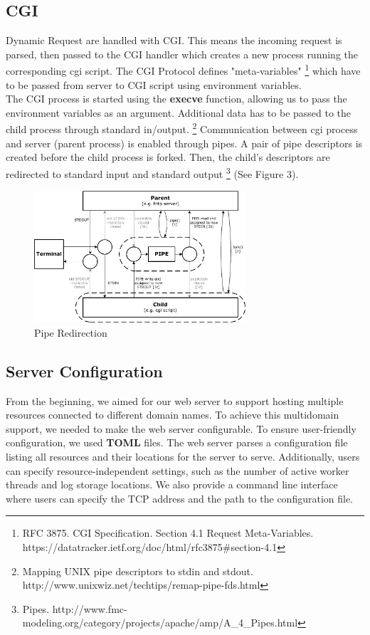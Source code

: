 \subsection*{CGI}
Dynamic Request are handled with CGI. This means the incoming request is parsed, then passed to the CGI handler which creates a new process running the corresponding cgi script. The CGI Protocol defines "meta-variables" \footnote{RFC 3875. CGI Specification. Section 4.1 Request Meta-Variables. https://datatracker.ietf.org/doc/html/rfc3875#section-4.1} which have to be passed from server to CGI script using environment variables. \\

The CGI process is started using the \textbf{execve} function, allowing us to pass the environment variables as an argument. Additional data has to be passed to the child process through standard in/output. \footnote{Mapping UNIX pipe descriptors to stdin and stdout. http://www.unixwiz.net/techtips/remap-pipe-fds.html}
Communication between cgi process and server (parent process) is enabled through pipes. A pair of pipe descriptors is created before the child process is forked. Then, the child's descriptors are redirected to standard input and standard output \footnote{Pipes. http://www.fmc-modeling.org/category/projects/apache/amp/A_4_Pipes.html} (See Figure 3).

\begin{figure}[h]
	\centering
	\includegraphics[width=0.7\textwidth]{figures/Pipes_BD.pdf}
	\caption{Pipe Redirection}
\end{figure}

\subsection*{Server Configuration}
From the beginning, we aimed for our web server to support hosting multiple resources connected to different domain names. To achieve this multidomain support, we needed to make the web server configurable. To ensure user-friendly configuration, we used \textbf{TOML} files. The web server parses a configuration file listing all resources and their locations for the server to serve. Additionally, users can specify resource-independent settings, such as the number of active worker threads and log storage locations. We also provide a command line interface where users can specify the TCP address and the path to the configuration file.

